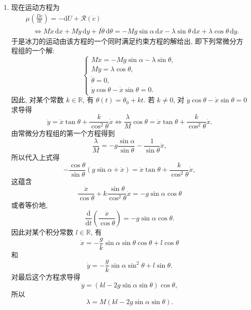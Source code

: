 \begin{description}[font=\normalfont,leftmargin=2em,labelwidth=1.5em]
\begin{enumerate}[label=(\alph*),ref=\alph*,leftmargin=*]
若 $k=0$, 对 $\dot y\cos\theta-\dot x\sin\theta=0$ 求导得
\[
  \ddot y\cos\theta_0-\ddot{x}\sin\theta_0=0\iff\frac{\lambda}{M}=0,
\]
因此
\[
  \begin{cases}
   x(t)=l\cos\theta_0\,t+x_0,\\
   y(t)=l\sin\theta_0\,t+y_0,\\
   \theta(t)=\theta_0,\\
   \lambda=0,
  \end{cases}
\]
其中 $x_0,y_0,\theta_0,l$ 是积分常数. 注意, 这时 $c(t)$ 以恒定速率 $|l|$ 描出经过 $(x_0,y_0)$ 且斜率为 $\tan\theta_0$ 的直线. 因为冰刀沿自身长度方向滑动, 这时约束反力为零.
\item 现在运动方程为
\begin{align*}
  &\mu\left(\frac{D\dot c}{\mathrm{d}t}\right)=-\mathrm{d}U+\mathcal R(\dot c)\\
  &\quad\iff M\ddot{x}\,\mathrm{d}x+M\ddot y\,\mathrm{d}y+I\ddot\theta\,\mathrm{d}\theta
       =-Mg\sin\alpha\,\mathrm{d}x-\lambda\sin\theta\,\mathrm{d}x+\lambda\cos\theta\,\mathrm{d}y.
\end{align*}
于是冰刀的运动由该方程的一个同时满足约束方程的解给出, 即下列常微分方程组的一个解:
\[
  \begin{cases}
   M\ddot{x}=-Mg\sin\alpha-\lambda\sin\theta,\\
   M\ddot y=\lambda\cos\theta,\\
   \ddot\theta=0,\\
   \dot y\cos\theta-\dot x\sin\theta=0.
  \end{cases}
\]
因此, 对某个常数 $k\in\mathbb{R}$, 有 $\theta(t)=\theta_0+kt$. 若 $k\ne0$, 对 $\dot y\cos\theta-\dot x\sin\theta=0$ 求导得
\[
  \ddot y=\ddot{x}\tan\theta+\frac{k}{\cos^2\theta}\dot x
  \iff\frac{\lambda}{M}\cos\theta=\ddot{x}\tan\theta+\frac{k}{\cos^2\theta}\dot x.
\]
由常微分方程组的第一个方程得到
\[
  \frac{\lambda}{M}=-g\frac{\sin\alpha}{\sin\theta}-\frac1{\sin\theta}\ddot{x},
\]
所以代入上式得
\[
  -\frac{\cos\theta}{\sin\theta}(g\sin\alpha+\ddot{x})
     =\ddot{x}\tan\theta+\frac{k}{\cos^2\theta}\dot x,
\]
这蕴含
\[
  \frac{\ddot{x}}{\cos\theta}+k\frac{\sin\theta}{\cos^2\theta}\dot x
  =-g\sin\alpha\cos\theta
\]
或者等价地,
\[
  \frac{\mathrm{d}}{\mathrm{d}t}\left(\frac{\dot x}{\cos\theta}\right)
  =-g\sin\alpha\cos\theta.
\]
因此对某个积分常数 $l\in\mathbb{R}$, 有
\[
  \dot x=-\frac gk\sin\alpha\sin\theta\cos\theta+l\cos\theta
\]
和
\[
  \dot y=-\frac gk\sin\alpha\sin^2\theta+l\sin\theta.
\]
对最后这个方程求导得
\[
  \ddot y=(kl-2g\sin\alpha\sin\theta)\cos\theta,
\]
所以
\[
  \lambda=M(kl-2g\sin\alpha\sin\theta).
\]
\end{enumerate}
\end{description}
